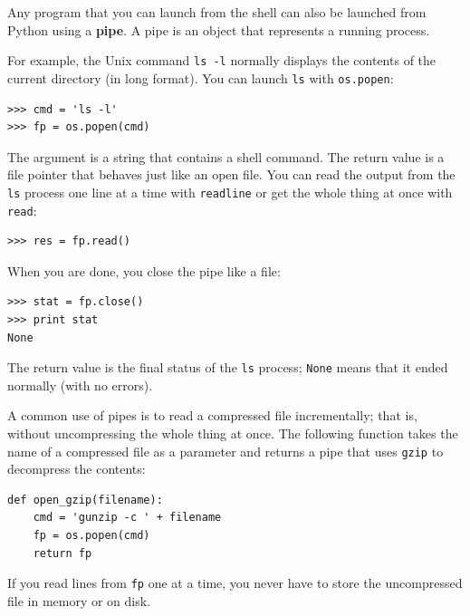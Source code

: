 \documentclass[10pt]{book}
\begin{document}

Any program that you can launch from the shell can also be
launched from Python using a {\bf pipe}.  A pipe is an object
that represents a running process.

For example, the Unix command {\tt ls -l} normally displays the
contents of the current directory (in long format).  You can
launch {\tt ls} with {\tt os.popen}:


\beforeverb
\begin{verbatim}
>>> cmd = 'ls -l'
>>> fp = os.popen(cmd)
\end{verbatim}
\afterverb
%
The argument is a string that contains a shell command.  The
return value is a file pointer that behaves just like an open
file.  You can read the output from the {\tt ls} process one
line at a time with {\tt readline} or get the whole thing at
once with {\tt read}:


\beforeverb
\begin{verbatim}
>>> res = fp.read()
\end{verbatim}
\afterverb
%
When you are done, you close the pipe like a file:


\beforeverb
\begin{verbatim}
>>> stat = fp.close()
>>> print stat
None
\end{verbatim}
\afterverb
%
The return value is the final status of the {\tt ls} process;
{\tt None} means that it ended normally (with no errors).


A common use of pipes is to read a compressed file incrementally;
that is, without uncompressing the whole thing at once.  The
following function takes the name of a compressed file as a
parameter and returns a pipe that uses {\tt gzip} to decompress
the contents:

\beforeverb
\begin{verbatim}
def open_gzip(filename):
    cmd = 'gunzip -c ' + filename
    fp = os.popen(cmd)
    return fp
\end{verbatim}
\afterverb
%
If you read lines from {\tt fp} one at a time, you never have
to store the uncompressed file in memory or on disk.
\end{document}
